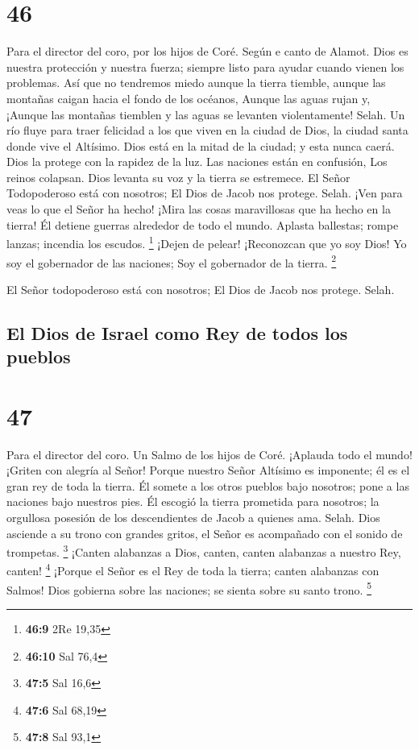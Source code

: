 \hypertarget{section-45}{%
\section{46}\label{section-45}}

Para el director del coro, por los hijos de Coré. Según e canto de
Alamot.  Dios es nuestra protección y nuestra fuerza;
siempre listo para ayudar cuando vienen los problemas.  Así
que no tendremos miedo aunque la tierra tiemble, aunque las montañas
caigan hacia el fondo de los océanos,  Aunque las aguas
rujan y, ¡Aunque las montañas tiemblen y las aguas se levanten
violentamente! Selah.  Un río fluye para traer felicidad a
los que viven en la ciudad de Dios, la ciudad santa donde vive el
Altísimo.  Dios está en la mitad de la ciudad; y esta nunca
caerá. Dios la protege con la rapidez de la luz.  Las
naciones están en confusión, Los reinos colapsan. Dios levanta su voz y
la tierra se estremece.  El Señor Todopoderoso está con
nosotros; El Dios de Jacob nos protege. Selah.  ¡Ven para
veas lo que el Señor ha hecho! ¡Mira las cosas maravillosas que ha hecho
en la tierra!  Él detiene guerras alrededor de todo el
mundo. Aplasta ballestas; rompe lanzas; incendia los escudos.
\footnote{\textbf{46:9} 2Re 19,35}  ¡Dejen de pelear!
¡Reconozcan que yo soy Dios! Yo soy el gobernador de las naciones; Soy
el gobernador de la tierra. \footnote{\textbf{46:10} Sal 76,4}

 El Señor todopoderoso está con nosotros; El Dios de Jacob
nos protege. Selah.

\hypertarget{el-dios-de-israel-como-rey-de-todos-los-pueblos}{%
\subsection{El Dios de Israel como Rey de todos los
pueblos}\label{el-dios-de-israel-como-rey-de-todos-los-pueblos}}

\hypertarget{section-46}{%
\section{47}\label{section-46}}

Para el director del coro. Un Salmo de los hijos de Coré. 
¡Aplauda todo el mundo! ¡Griten con alegría al Señor! 
Porque nuestro Señor Altísimo es imponente; él es el gran rey de toda la
tierra.  Él somete a los otros pueblos bajo nosotros; pone a
las naciones bajo nuestros pies.  Él escogió la tierra
prometida para nosotros; la orgullosa posesión de los descendientes de
Jacob a quienes ama. Selah.  Dios asciende a su trono con
grandes gritos, el Señor es acompañado con el sonido de trompetas.
\footnote{\textbf{47:5} Sal 16,6}  ¡Canten alabanzas a Dios,
canten, canten alabanzas a nuestro Rey, canten! \footnote{\textbf{47:6}
  Sal 68,19}  ¡Porque el Señor es el Rey de toda la tierra;
canten alabanzas con Salmos!  Dios gobierna sobre las
naciones; se sienta sobre su santo trono. \footnote{\textbf{47:8} Sal
  93,1}

